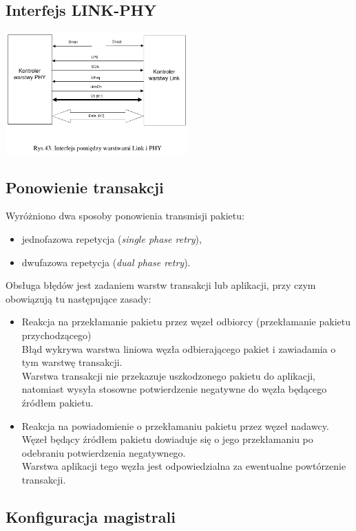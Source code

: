 \subsection{Interfejs LINK-PHY}
\includegraphics[width=7cm]{./wyklady/FIREWIRE_53_1.pdf}

\subsection{Ponowienie transakcji}
Wyróżniono dwa sposoby ponowienia transmisji pakietu:
\begin{itemize}
	\item jednofazowa repetycja (\emph{single phase retry}),
	\item dwufazowa repetycja (\emph{dual phase retry}).
\end{itemize}
Obsługa błędów jest zadaniem warstw transakcji lub aplikacji, przy czym obowiązują tu następujące zasady:
\begin{itemize}
	\item Reakcja na przekłamanie pakietu przez węzeł odbiorcy (przekłamanie pakietu przychodzącego)\\
	Błąd wykrywa warstwa liniowa węzła odbierającego pakiet i zawiadamia o tym warstwę transakcji.\\
	Warstwa transakcji nie przekazuje uszkodzonego pakietu do aplikacji, natomiast wysyła stosowne potwierdzenie negatywne do węzła będącego źródłem pakietu.
	\item Reakcja na powiadomienie o przekłamaniu pakietu przez węzeł nadawcy.\\
	Węzeł będący źródłem pakietu dowiaduje się o jego przekłamaniu po odebraniu potwierdzenia negatywnego.\\
	Warstwa aplikacji tego węzła jest odpowiedzialna za ewentualne powtórzenie transakcji.
\end{itemize}

\subsection{Konfiguracja magistrali}
